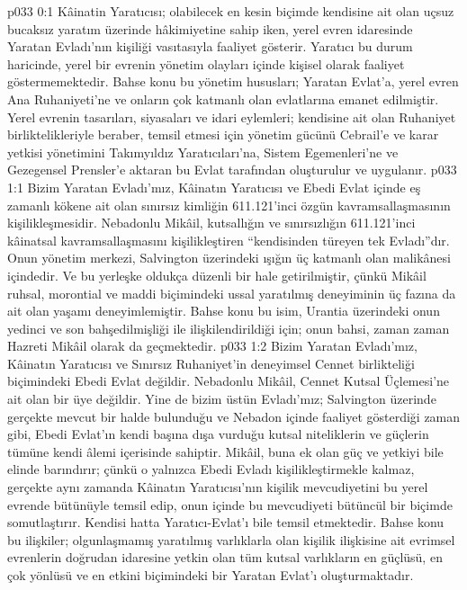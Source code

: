 \vs p033 0:1 Kâinatin Yaratıcısı; olabilecek en kesin biçimde kendisine ait olan uçsuz bucaksız yaratım üzerinde hâkimiyetine sahip iken, yerel evren idaresinde Yaratan Evladı’nın kişiliği vasıtasıyla faaliyet gösterir. Yaratıcı bu durum haricinde, yerel bir evrenin yönetim olayları içinde kişisel olarak faaliyet göstermemektedir. Bahse konu bu yönetim hususları; Yaratan Evlat’a, yerel evren Ana Ruhaniyeti’ne ve onların çok katmanlı olan evlatlarına emanet edilmiştir. Yerel evrenin tasarıları, siyasaları ve idari eylemleri; kendisine ait olan Ruhaniyet birliktelikleriyle beraber, temsil etmesi için yönetim gücünü Cebrail’e ve karar yetkisi yönetimini Takımyıldız Yaratıcıları’na, Sistem Egemenleri’ne ve Gezegensel Prensler’e aktaran bu Evlat tarafından oluşturulur ve uygulanır.
\vs p033 1:1 Bizim Yaratan Evladı’mız, Kâinatın Yaratıcısı ve Ebedi Evlat içinde eş zamanlı kökene ait olan sınırsız kimliğin 611.121’inci özgün kavramsallaşmasının kişilikleşmesidir. Nebadonlu Mikâil, kutsallığın ve sınırsızlığın 611.121’inci kâinatsal kavramsallaşmasını kişilikleştiren “kendisinden türeyen tek Evladı”dır. Onun yönetim merkezi, Salvington üzerindeki ışığın üç katmanlı olan malikânesi içindedir. Ve bu yerleşke oldukça düzenli bir hale getirilmiştir, çünkü Mikâil ruhsal, morontial ve maddi biçimindeki ussal yaratılmış deneyiminin üç fazına da ait olan yaşamı deneyimlemiştir. Bahse konu bu isim, Urantia üzerindeki onun yedinci ve son bahşedilmişliği ile ilişkilendirildiği için; onun bahsi, zaman zaman Hazreti Mikâil olarak da geçmektedir.
\vs p033 1:2 Bizim Yaratan Evladı’mız, Kâinatın Yaratıcısı ve Sınırsız Ruhaniyet’in deneyimsel Cennet birlikteliği biçimindeki Ebedi Evlat değildir. Nebadonlu Mikâil, Cennet Kutsal Üçlemesi’ne ait olan bir üye değildir. Yine de bizim üstün Evladı’mız; Salvington üzerinde gerçekte mevcut bir halde bulunduğu ve Nebadon içinde faaliyet gösterdiği zaman gibi, Ebedi Evlat’ın kendi başına dışa vurduğu kutsal niteliklerin ve güçlerin tümüne kendi âlemi içerisinde sahiptir. Mikâil, buna ek olan güç ve yetkiyi bile elinde barındırır; çünkü o yalnızca Ebedi Evladı kişilikleştirmekle kalmaz, gerçekte aynı zamanda Kâinatın Yaratıcısı’nın kişilik mevcudiyetini bu yerel evrende bütünüyle temsil edip, onun içinde bu mevcudiyeti bütüncül bir biçimde somutlaştırır. Kendisi hatta Yaratıcı\hyp{}Evlat’ı bile temsil etmektedir. Bahse konu bu ilişkiler; olgunlaşmamış yaratılmış varlıklarla olan kişilik ilişkisine ait evrimsel evrenlerin doğrudan idaresine yetkin olan tüm kutsal varlıkların en güçlüsü, en çok yönlüsü ve en etkini biçimindeki bir Yaratan Evlat’ı oluşturmaktadır.
